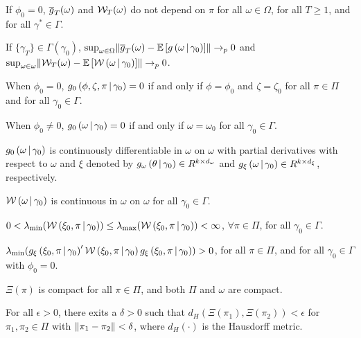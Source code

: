 \documentclass[11pt, letterpaper, twoside, final]{article}
\begin{document}
\begin{appendices}
    \begin{assump}[GMM 1]\label{ass:GMM1}
    \begin{assumplist}
        \item If $\phi_0=0$, $\sampmom(\omega)$ and $\W_{T}(\omega)$ do not depend on $\pi$ for all $\omega \in \Omega$,
            for all $T \geq 1$, and for all $\gamma^{*}\in \Gamma.$ 
            \label{ass:GMM1a}
        \item If $\lbrace \gamma_{T} \rbrace \in \Gamma\left(\gamma_0\right)$, $\sup_{\omega \in \Omega}
            \norm*{\sampmom(\omega) - \E\left[g\left(\omega \mvert \gamma_0\right)\right]} \pto 0$ and $\sup_{\omega
            \in \omega} \norm{\W_{T}(\omega)-\E\left[\W\left(\omega \mvert \gamma_0\right)\right]} \pto 0$.
            \label{ass:GMM1b}
        \item When $\phi_0 = 0$,  $g_0\left(\phi, \zeta ,\pi \mvert \gamma_0\right) = 0$ if and only if $\phi
            =\phi_0$ and $\zeta = \zeta_0$ for all $\pi \in \Pi$ and for all $\gamma_0 \in \Gamma.$
            \label{ass:GMM1c}
        \item When $\phi_0 \neq 0$, $g_0\left(\omega \mvert \gamma_0\right)=0$ if and only if $\omega =\omega_0$ for all
            $\gamma_0 \in \Gamma.$
            \label{ass:GMM1d}
        \item  $g_0\left(\omega \mvert \gamma_0\right)$ is continuously differentiable in $\omega $ on $\omega$ with
            partial derivatives with respect to $\omega$ and $\xi$ denoted by $g_{\omega}\left(\theta \mvert
            \gamma_0\right) \in R^{k\times d_{\omega }}$ and $g_{\xi }\left(\omega \mvert \gamma_0\right)\in R^{k\times
            d_{\xi }}$, respectively.
            \label{ass:GMM1e}
        \item $\W\left(\omega \mvert \gamma_0\right)$ is continuous in $\omega$ on $\omega$ for all $\gamma_0\in
            \Gamma$.  \label{ass:GMM1f}
        \item $0 < \lambda_{\min}(\W\left(\xi_0, \pi \mvert \gamma_0\right))\leq \lambda_{\max }(\W\left(\xi_0,\pi
            \mvert \gamma_0\right)) < \infty$, $\forall \pi \in \Pi$, for all $\gamma_0 \in \Gamma$.
            \label{ass:GMM1g}
        \item $\lambda_{\min} (g_{\xi}\left(\xi_0,\pi \mvert \gamma_0\right)^{\prime} \W\left(\xi_0,\pi \mvert
            \gamma_0\right)g_{\xi }\left(\xi_0,\pi \mvert \gamma_0\right))>0$, for all $\pi \in \Pi$,  and for all 
            $\gamma_0 \in \Gamma$ with $\phi_0=0.$
            \label{ass:GMM1h}
        \item$\Xi(\pi)$ is compact for all $\pi \in \Pi$, and both $\Pi$ and $\omega$ are compact.
            \label{ass:GMM1i}
        \item For all $\epsilon > 0$, there exits a $\delta > 0$ such that $d_{H}\left(\Xi \left(\pi_{1}\right),
            \Xi \left( \pi_{2}\right) \right) < \epsilon$ for $\pi_{1}, \pi_{2} \in \Pi$ with
            $\norm*{\pi_{1}-\pi_{2}} < \delta$, where $d_{H}\left( \cdot \right)$ is the Hausdorff metric.
            \label{ass:GMM1j}
    \end{assumplist}
    \end{assump}
    

\end{appendices}
\end{document}
